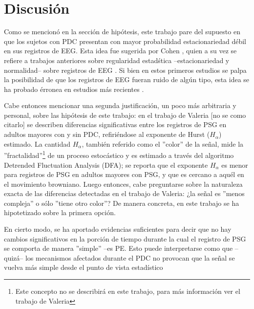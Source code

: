 \section{Discusi\'on}

Como se mencion\'o en la secci\'on de hip\'otesis, este trabajo pare del supuesto en que los
sujetos con PDC presentan con mayor probabilidad estacionariedad d\'ebil en sus registros de EEG.
Esta idea fue sugerida por Cohen \cite{Cohen77}, quien a su vez se refiere a trabajos anteriores
sobre regularidad estad\'stica --estacionariedad y normalidad-- sobre registros de 
EEG \cite{McEwen75,Sugimoto78,Kawabata73}. 
Si bien en estos primeros estudios se palpa la posibilidad de que los registros de EEG fueran
ruido de alg\'un tipo, esta idea se ha probado \'erronea en estudios m\'as recientes 
\cite{Klonowski09}.

Cabe entonces mencionar una segunda justificaci\'on, un poco m\'as arbitraria y personal, sobre
las hip\'otesis de este trabajo: en el trabajo de Valeria [no se como citarlo] se describen
diferencias significativas entre los registros de PSG en adultos mayores con y sin PDC,
refiri\'endose al exponente de Hurst ($H_\alpha$) estimado.
La cantidad $H_\alpha$, tambi\'en referido como el ''color'' de la se\~nal,
mide la ''fractalidad''\footnote{Este concepto no se
describir\'a en este trabajo, para m\'as informaci\'on ver el trabajo de Valeria} 
de un proceso estoc\'astico y es estimado a trav\'es del
algoritmo Detrended Fluctuation Analysis (DFA); se reporta
que el exponente $H_\alpha$ es menor para registros de PSG en adultos mayores con PSG, y que es
cercano a aqu\'el en el movimiento browniano. 
Luego entonces, cabe preguntarse sobre la naturaleza exacta de las diferencias detectadas en 
el trabajo de Valeria: ¿la se\~nal es ''menos compleja'' o 
s\'olo ''tiene otro color''?
De manera concreta, en este trabajo se ha hipotetizado sobre la primera opci\'on.

En cierto modo, se ha aportado evidencias suficientes para decir que no hay cambios significativos
en la porci\'on de tiempo durante la cual el registro de PSG se comporta de manera ''simple''
--es PE. Esto puede interpretarse como que --quiz\'a-- los mecanismos afectados durante el PDC no 
provocan que la se\~nal se vuelva m\'as simple desde el punto de vista estad\'istico

